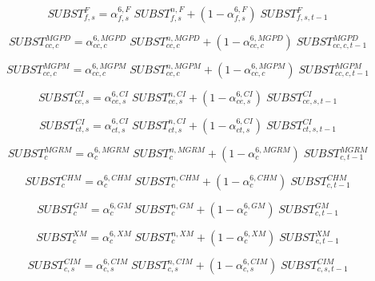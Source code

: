 \documentclass[12pt]{article}
\numberwithin{equation}{section}
\begin{document}
\begin{dmath}
SUBST^{F}_{f, s} = \alpha^{{6},F}_{f, s} \; SUBST^{n,F}_{f, s} + \left( 1 - \alpha^{{6},F}_{f, s} \right) \; SUBST^{F}_{f, s, t-1}
\end{dmath}

\begin{dmath}
SUBST^{MGPD}_{cc, c} = \alpha^{{6},MGPD}_{cc, c} \; SUBST^{n,MGPD}_{cc, c} + \left( 1 - \alpha^{{6},MGPD}_{cc, c} \right) \; SUBST^{MGPD}_{cc, c, t-1}
\end{dmath}

\begin{dmath}
SUBST^{MGPM}_{cc, c} = \alpha^{{6},MGPM}_{cc, c} \; SUBST^{n,MGPM}_{cc, c} + \left( 1 - \alpha^{{6},MGPM}_{cc, c} \right) \; SUBST^{MGPM}_{cc, c, t-1}
\end{dmath}

\begin{dmath}
SUBST^{CI}_{ce, s} = \alpha^{{6},CI}_{ce, s} \; SUBST^{n,CI}_{ce, s} + \left( 1 - \alpha^{{6},CI}_{ce, s} \right) \; SUBST^{CI}_{ce, s, t-1}
\end{dmath}

\begin{dmath}
SUBST^{CI}_{ct, s} = \alpha^{{6},CI}_{ct, s} \; SUBST^{n,CI}_{ct, s} + \left( 1 - \alpha^{{6},CI}_{ct, s} \right) \; SUBST^{CI}_{ct, s, t-1}
\end{dmath}

\begin{dmath}
SUBST^{MGRM}_{c} = \alpha^{{6},MGRM}_{c} \; SUBST^{n,MGRM}_{c} + \left( 1 - \alpha^{{6},MGRM}_{c} \right) \; SUBST^{MGRM}_{c, t-1}
\end{dmath}

\begin{dmath}
SUBST^{CHM}_{c} = \alpha^{{6},CHM}_{c} \; SUBST^{n,CHM}_{c} + \left( 1 - \alpha^{{6},CHM}_{c} \right) \; SUBST^{CHM}_{c, t-1}
\end{dmath}

\begin{dmath}
SUBST^{GM}_{c} = \alpha^{{6},GM}_{c} \; SUBST^{n,GM}_{c} + \left( 1 - \alpha^{{6},GM}_{c} \right) \; SUBST^{GM}_{c, t-1}
\end{dmath}

\begin{dmath}
SUBST^{XM}_{c} = \alpha^{{6},XM}_{c} \; SUBST^{n,XM}_{c} + \left( 1 - \alpha^{{6},XM}_{c} \right) \; SUBST^{XM}_{c, t-1}
\end{dmath}

\begin{dmath}
SUBST^{CIM}_{c, s} = \alpha^{{6},CIM}_{c, s} \; SUBST^{n,CIM}_{c, s} + \left( 1 - \alpha^{{6},CIM}_{c, s} \right) \; SUBST^{CIM}_{c, s, t-1}
\end{dmath}
\end{document}
